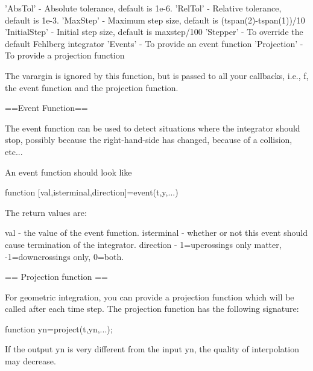  'AbsTol'      - Absolute tolerance, default is 1e-6.
 'RelTol'      - Relative tolerance, default is 1e-3.
 'MaxStep'     - Maximum step size, default is (tspan(2)-tspan(1))/10
 'InitialStep' - Initial step size, default is maxstep/100
 'Stepper'     - To override the default Fehlberg integrator
 'Events'      - To provide an event function
 'Projection'  - To provide a projection function

 The varargin is ignored by this function, but is passed to all your callbacks, i.e.,
 f, the event function and the projection function.

 ==Event Function==

 The event function can be used to detect situations where the integrator should stop,
 possibly because the right-hand-side has changed, because of a collision, etc...

 An event function should look like

    function [val,isterminal,direction]=event(t,y,...)

 The return values are:

 val        - the value of the event function.
 isterminal - whether or not this event should cause termination of the integrator.
 direction  - 1=upcrossings only matter, -1=downcrossings only, 0=both.

 == Projection function ==

 For geometric integration, you can provide a projection function which will be
 called after each time step. The projection function has the following signature:

     function yn=project(t,yn,...);

 If the output yn is very different from the input yn, the quality of interpolation
 may decrease.
